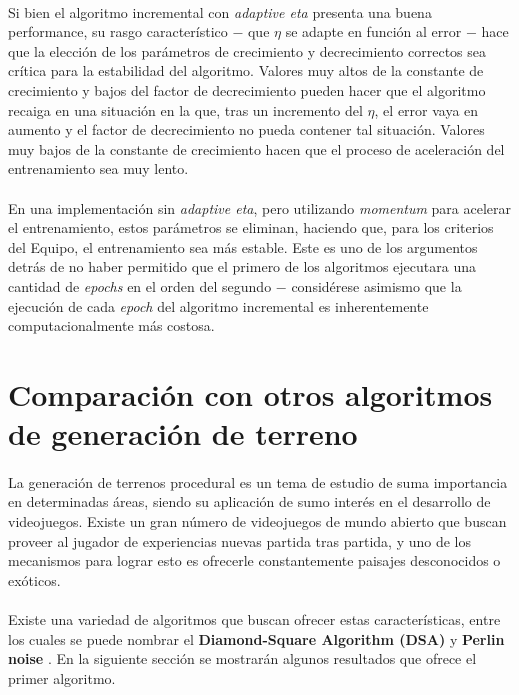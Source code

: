 \documentclass[12pt, twocolumn]{article}
\begin{document}
	\paragraph{} Si bien el algoritmo incremental con \textit{adaptive eta} presenta una buena performance, su rasgo característico $-$ que $\eta$ se adapte en función al error $-$ hace que la elección de los parámetros de crecimiento y decrecimiento correctos sea crítica para la estabilidad del algoritmo. Valores muy altos de la constante de crecimiento y bajos del factor de decrecimiento pueden hacer que el algoritmo recaiga en una situación en la que, tras un incremento del $\eta$, el error vaya en aumento y el factor de decrecimiento no pueda contener tal situación. Valores muy bajos de la constante de crecimiento hacen que el proceso de aceleración del entrenamiento sea muy lento. 
	
	\paragraph{} En una implementación sin \textit{adaptive eta}, pero utilizando \textit{momentum} para acelerar el entrenamiento, estos parámetros se eliminan, haciendo que, para los criterios del Equipo, el entrenamiento sea más estable. Este es uno de los argumentos detrás de no haber permitido que el primero de los algoritmos ejecutara una cantidad de \textit{epochs} en el orden del segundo $-$ considérese asimismo que la ejecución de cada \textit{epoch} del algoritmo incremental es inherentemente computacionalmente más costosa. 
	
	\section[Otros algoritmos]{Comparación con otros algoritmos de generación de terreno}
	
	\paragraph{} La generación de terrenos procedural es un tema de estudio de suma importancia en determinadas áreas, siendo su aplicación de sumo interés en el desarrollo de videojuegos. Existe un gran número de videojuegos de mundo abierto que buscan proveer al jugador de experiencias nuevas partida tras partida, y uno de los mecanismos para lograr esto es ofrecerle constantemente paisajes desconocidos o exóticos.  
	
	\paragraph{} Existe una variedad de algoritmos que buscan ofrecer estas características, entre los cuales se puede nombrar el \textbf{Diamond-Square Algorithm (DSA)} \cite{dsa} y \textbf{Perlin noise} \cite{perlin}. En la siguiente sección se mostrarán algunos resultados que ofrece el primer algoritmo. 
	
\end{document}
